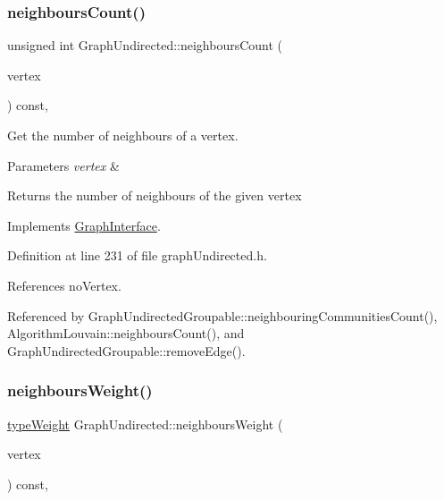 \subsubsection{\texorpdfstring{neighbours\+Count()}{neighboursCount()}}
{\footnotesize\ttfamily unsigned int Graph\+Undirected\+::neighbours\+Count (\begin{DoxyParamCaption}\item[{const \hyperlink{edge_8h_a5fbd20c46956d479cb10afc9855223f6}{type\+Vertex} \&}]{vertex }\end{DoxyParamCaption}) const\hspace{0.3cm}{\ttfamily [inline]}, {\ttfamily [virtual]}}



Get the number of neighbours of a vertex. 


\begin{DoxyParams}{Parameters}
{\em vertex} & \\
\hline
\end{DoxyParams}
\begin{DoxyReturn}{Returns}
the number of neighbours of the given vertex 
\end{DoxyReturn}


Implements \hyperlink{classGraphInterface_ae9b85226881a84124ce6dbaba498edce}{Graph\+Interface}.



Definition at line 231 of file graph\+Undirected.\+h.



References no\+Vertex.



Referenced by Graph\+Undirected\+Groupable\+::neighbouring\+Communities\+Count(), Algorithm\+Louvain\+::neighbours\+Count(), and Graph\+Undirected\+Groupable\+::remove\+Edge().

\mbox{\label{classGraphUndirected_aa6c4a4b19efb152de6cdc21d67ac5eed}} 
\subsubsection{\texorpdfstring{neighbours\+Weight()}{neighboursWeight()}}
{\footnotesize\ttfamily \hyperlink{edge_8h_a2e7ea3be891ac8b52f749ec73fee6dd2}{type\+Weight} Graph\+Undirected\+::neighbours\+Weight (\begin{DoxyParamCaption}\item[{const \hyperlink{edge_8h_a5fbd20c46956d479cb10afc9855223f6}{type\+Vertex} \&}]{vertex }\end{DoxyParamCaption}) const\hspace{0.3cm}{\ttfamily [inline]}, {\ttfamily [virtual]}}



